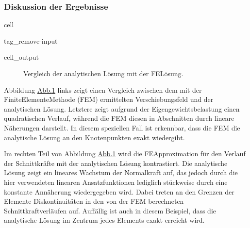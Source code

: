 \documentclass[letterpaper,10pt,german]{jupyterBook}
\begin{document}
\subsubsection{Diskussion der Ergebnisse}
\label{\detokenize{chapters/chapter2/1dFEM:diskussion-der-ergebnisse}}
\begin{sphinxuseclass}{cell}
\begin{sphinxuseclass}{tag_remove-input}\begin{sphinxVerbatimOutput}

\begin{sphinxuseclass}{cell_output}
\begin{figure}[htbp]
\centering
\capstart

\noindent{}
\caption{Vergleich der analytischen Lösung mit der FE\sphinxhyphen{}Lösung.}\label{\detokenize{chapters/chapter2/1dFEM:fe-compare}}\end{figure}

\end{sphinxuseclass}\end{sphinxVerbatimOutput}

\end{sphinxuseclass}
\end{sphinxuseclass}
\sphinxAtStartPar
Abbildung \hyperref[\detokenize{chapters/chapter2/1dFEM:fe-compare}]{Abb.\@ \ref{\detokenize{chapters/chapter2/1dFEM:fe-compare}}} links zeigt einen Vergleich zwischen dem mit der Finite\sphinxhyphen{}Elemente\sphinxhyphen{}Methode (FEM) ermittelten Verschiebungsfeld und der analytischen Lösung. Letztere zeigt aufgrund der Eigengewichtsbelastung einen quadratischen Verlauf, während die FEM diesen in Abschnitten durch lineare Näherungen darstellt. In diesem speziellen Fall ist erkennbar, dass die FEM die analytische Lösung an den Knotenpunkten exakt wiedergibt.

\sphinxAtStartPar
Im rechten Teil von Abbildung \hyperref[\detokenize{chapters/chapter2/1dFEM:fe-compare}]{Abb.\@ \ref{\detokenize{chapters/chapter2/1dFEM:fe-compare}}} wird die FE\sphinxhyphen{}Approximation für den Verlauf der Schnittkräfte mit der analytischen Lösung kontrastiert. Die analytische Lösung zeigt ein lineares Wachstum der Normalkraft auf, das jedoch durch die hier verwendeten linearen Ansatzfunktionen lediglich stückweise durch eine konstante Annäherung wiedergegeben wird. Dabei treten an den Grenzen der Elemente Diskontinuitäten in den von der FEM berechneten Schnittkraftverläufen auf. Auffällig ist auch in diesem Beispiel, dass die analytische Lösung im Zentrum jedes Elements exakt erreicht wird.
\end{document}
